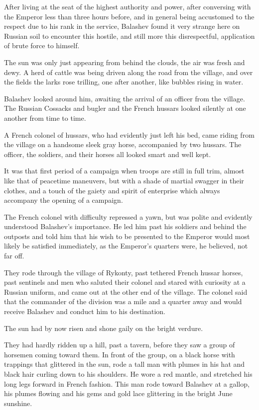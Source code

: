 After living at the seat of the highest authority and power,
after conversing with the Emperor less than three hours before,
and in general being accustomed to the respect due to his rank in
the service, Balashev found it very strange here on Russian soil
to encounter this hostile, and still more this disrespectful,
application of brute force to himself.

The sun was only just appearing from behind the clouds, the air
was fresh and dewy. A herd of cattle was being driven along the
road from the village, and over the fields the larks rose
trilling, one after another, like bubbles rising in water.

Balashev looked around him, awaiting the arrival of an officer
from the village. The Russian Cossacks and bugler and the French
hussars looked silently at one another from time to time.

A French colonel of hussars, who had evidently just left his bed,
came riding from the village on a handsome sleek gray horse,
accompanied by two hussars. The officer, the soldiers, and their
horses all looked smart and well kept.

It was that first period of a campaign when troops are still in
full trim, almost like that of peacetime maneuvers, but with a
shade of martial swagger in their clothes, and a touch of the
gaiety and spirit of enterprise which always accompany the
opening of a campaign.

The French colonel with difficulty repressed a yawn, but was
polite and evidently understood Balashev's importance. He led him
past his soldiers and behind the outposts and told him that his
wish to be presented to the Emperor would most likely be
satisfied immediately, as the Emperor's quarters were, he
believed, not far off.

They rode through the village of Rykonty, past tethered French
hussar horses, past sentinels and men who saluted their colonel
and stared with curiosity at a Russian uniform, and came out at
the other end of the village. The colonel said that the commander
of the division was a mile and a quarter away and would receive
Balashev and conduct him to his destination.

The sun had by now risen and shone gaily on the bright verdure.

They had hardly ridden up a hill, past a tavern, before they saw
a group of horsemen coming toward them. In front of the group, on
a black horse with trappings that glittered in the sun, rode a
tall man with plumes in his hat and black hair curling down to
his shoulders. He wore a red mantle, and stretched his long legs
forward in French fashion. This man rode toward Balashev at a
gallop, his plumes flowing and his gems and gold lace glittering
in the bright June sunshine.

